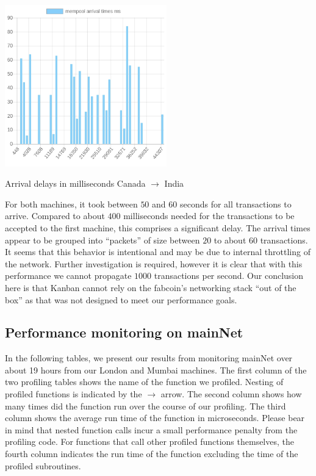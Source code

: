 \documentclass{article}
\begin{document}
\begin{table}
	\begin{center}
		\includegraphics[width = 7cm]{./images/mempoolArrivalsMumbai.png}
	\end{center}
	\caption{\label{tableArrivalTimesToMumbai} Arrival delays in milliseconds Canada $ \to$ India}
\end{table}

For both machines, it took between $50$ and $60$ seconds for all transactions to arrive. Compared to about $400$ milliseconds needed for the transactions to be accepted to the first machine, this comprises a significant delay. The arrival times appear to be grouped into ``packets'' of size between $20$ to about $60$ transactions. It seems that this behavior is intentional and may be due to internal throttling of the network. Further investigation is required, however it is clear that with this performance we cannot propagate $1000$ transactions per second. Our conclusion here is that Kanban cannot rely on the fabcoin's networking stack ``out of the box'' as that was not designed to meet our performance goals. 

\subsection{Performance monitoring on mainNet}
In the following tables, we present our results from monitoring mainNet over about 19 hours from our London and Mumbai machines. The first column of the two profiling tables shows the name of the function we profiled. Nesting of profiled functions is indicated by the $ \to $ arrow. The second column shows how many times did the function run over the course of our profiling. The third column shows the average run time of the function in microseconds. Please bear in mind that nested function calls incur a small performance penalty from the profiling code. For functions that call other profiled functions themselves, the fourth column indicates the run time of the function excluding the time of the profiled subroutines.
\end{document}

